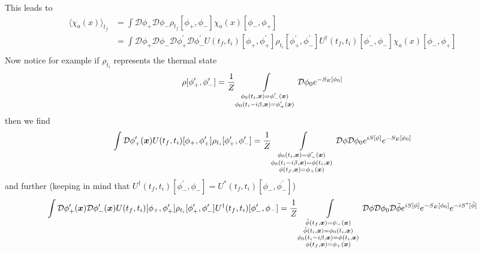 This leads to
\begin{align}
    \langle\chi_a(x)\rangle_{t_f} & =\int\mathcal{D}\phi_+\mathcal{D}\phi_-\rho_{t_f}[\phi_+,\phi_-]\chi_a(x)[\phi_-,\phi_+]                                                                                                                                       \\
                                  & =\int\mathcal{D}\phi_+\mathcal{D}\phi_-\mathcal{D}\phi^\prime_+\mathcal{D}\phi^\prime_-U(t_f,t_i)[\phi_+,\phi^\prime_+]\rho_{t_i}[\phi^\prime_+,\phi^\prime_-]U^\dagger(t_f,t_i)[\phi^\prime_-,\phi_-]\chi_a(x)[\phi_-,\phi_+] \\
\end{align}
Now notice for example if $\rho_{t_i}$ represents the thermal state
\begin{equation}
    \rho[\phi_+^\prime,\phi_-^\prime]=\frac{1}{Z}\int\limits_{\substack{\phi_0(t_i,{\boldsymbol{x}})=\phi^\prime_-({\boldsymbol{x}})\\\phi_0(t_i-{i}\beta,{\boldsymbol{x}})=\phi^\prime_+({\boldsymbol{x}})}}\mathcal{D}\phi_0e^{-S_E[\phi_0]}
\end{equation}
then we find
\begin{equation}
    \int\mathcal{D}\phi_+^\prime({\boldsymbol{x}})U(t_f,t_i)[\phi_+,\phi^\prime_+]\rho_{t_i}[\phi^\prime_+,\phi^\prime_-]=\frac{1}{Z}\int\limits_{\substack{\phi_0(t_i,{\boldsymbol{x}})=\phi_-^\prime({\boldsymbol{x}})\\\phi_0(t_i-{i}\beta,{\boldsymbol{x}})=\phi(t_i,{\boldsymbol{x}})\\\phi(t_f,{\boldsymbol{x}})=\phi_+({\boldsymbol{x}})}}\mathcal{D}\phi\mathcal{D}\phi_0 e^{{i} S[\phi]}e^{-S_E[\phi_0]}
\end{equation}
and further (keeping in mind that $U^\dagger(t_f,t_i)[\phi_-^\prime,\phi_-]=U^*(t_f,t_i)[\phi_-,\phi_-^\prime]$)
\begin{equation}
    \int\mathcal{D}\phi_+^\prime({\boldsymbol{x}})\mathcal{D}\phi_-^\prime({\boldsymbol{x}})U(t_f,t_i)[\phi_+,\phi^\prime_+]\rho_{t_i}[\phi^\prime_+,\phi^\prime_-]U^\dagger(t_f,t_i)[\phi_-^\prime,\phi_-]=\frac{1}{Z}\int\limits_{\substack{\tilde{\phi}(t_f,{\boldsymbol{x}})=\phi_-({\boldsymbol{x}})\\\tilde{\phi}(t_i,{\boldsymbol{x}})=\phi_0(t_i,{\boldsymbol{x}})\\\phi_0(t_i-{i}\beta,{\boldsymbol{x}})=\phi(t_i,{\boldsymbol{x}})\\\phi(t_f,{\boldsymbol{x}})=\phi_+({\boldsymbol{x}})}}\mathcal{D}\phi\mathcal{D}\phi_0\mathcal{D}\tilde{\phi} e^{{i} S[\phi]}e^{-S_E[\phi_0]}e^{-{i} S^*[\tilde{\phi}]}
\end{equation}

